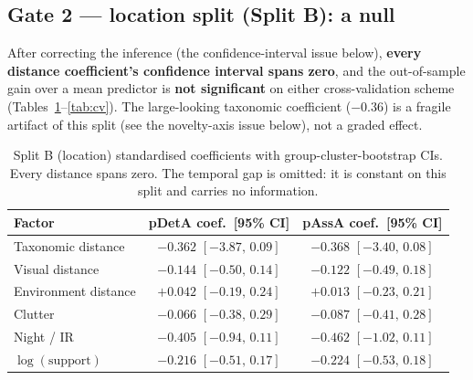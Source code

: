 \documentclass[11pt]{article}
\newcommand{\pdeta}{\textsf{pDetA}}
\newcommand{\passa}{\textsf{pAssA}}
\begin{document}
\subsection{Gate 2 --- location split (Split B): a null}
After correcting the inference (the confidence-interval issue below), \textbf{every distance coefficient's confidence
interval spans zero}, and the out-of-sample gain over a mean predictor is \textbf{not significant} on
either cross-validation scheme (Tables~\ref{tab:coefB}--\ref{tab:cv}). The large-looking taxonomic
coefficient ($-0.36$) is a fragile artifact of this split (see the novelty-axis issue below), not a graded
effect.

\begin{table}[h]
\centering
\small
\begin{tabular}{lcc}
\toprule
Factor & \pdeta{} coef.\ [95\% CI] & \passa{} coef.\ [95\% CI] \\
\midrule
Taxonomic distance   & $-0.362$ $[-3.87,\,0.09]$ & $-0.368$ $[-3.40,\,0.08]$ \\
Visual distance      & $-0.144$ $[-0.50,\,0.14]$ & $-0.122$ $[-0.49,\,0.18]$ \\
Environment distance & $+0.042$ $[-0.19,\,0.24]$ & $+0.013$ $[-0.23,\,0.21]$ \\
Clutter              & $-0.066$ $[-0.38,\,0.29]$ & $-0.087$ $[-0.41,\,0.28]$ \\
Night / IR           & $-0.405$ $[-0.94,\,0.11]$ & $-0.462$ $[-1.02,\,0.11]$ \\
$\log(\text{support})$ & $-0.216$ $[-0.51,\,0.17]$ & $-0.224$ $[-0.53,\,0.18]$ \\
\bottomrule
\end{tabular}
\caption{Split B (location) standardised coefficients with group-cluster-bootstrap CIs. Every distance
spans zero. The temporal gap is omitted: it is constant on this split and carries no information.}
\label{tab:coefB}
\end{table}
\end{document}

